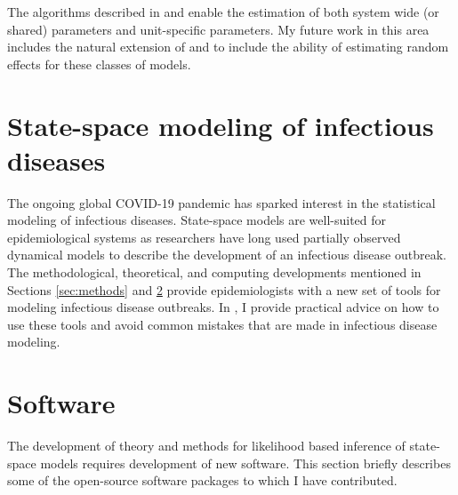 \documentclass{article}
\begin{document}
The algorithms described in \cite{ionides22} and \cite{wheeler2023-b} enable the estimation of both system wide (or shared) parameters and unit-specific parameters.
My future work in this area includes the natural extension of \cite{ionides22} and \cite{wheeler2023-b} to include the ability of estimating random effects for these classes of models.


\section{State-space modeling of infectious diseases}\label{sec:epi}

The ongoing global COVID-19 pandemic has sparked interest in the statistical modeling of infectious diseases.
State-space models are well-suited for epidemiological systems as researchers have long used partially observed dynamical models to describe the development of an infectious disease outbreak.
The methodological, theoretical, and computing developments mentioned in Sections \ref{sec:methods} and \ref{sec:software} provide epidemiologists with a new set of tools for modeling infectious disease outbreaks.
In \cite{wheeler24}, I provide practical advice on how to use these tools and avoid common mistakes that are made in infectious disease modeling.

\section{Software}\label{sec:software}

The development of theory and methods for likelihood based inference of state-space models requires development of new software.
This section briefly describes some of the open-source software packages to which I have contributed.
\end{document}
